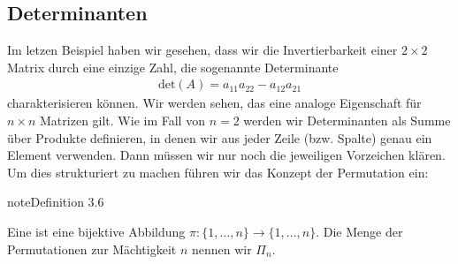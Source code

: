\documentclass[letterpaper,10pt,english]{jupyterBook}
\begin{document}
\subsection{Determinanten}
\label{\detokenize{vektorraeume/LGS:determinanten}}
Im letzen Beispiel haben wir gesehen, dass wir die Invertierbarkeit einer \(2 \times 2\) Matrix durch eine einzige Zahl, die sogenannte Determinante
\begin{equation*}
\begin{split} \text{det}(A) = a_{11} a_{22} - a_{12} a_{21}\end{split}
\end{equation*}
charakterisieren können. Wir werden sehen, das eine analoge Eigenschaft für \(n \times n\) Matrizen gilt. Wie im Fall von \(n=2\) werden wir Determinanten als Summe über Produkte definieren, in denen wir aus jeder Zeile (bzw. Spalte) genau ein Element verwenden. Dann müssen wir nur noch die jeweiligen Vorzeichen klären. Um dies strukturiert zu machen führen wir das Konzept der Permutation ein:
\label{vektorraeume/LGS:definition-10}
\begin{sphinxadmonition}{note}{Definition 3.6}



Eine  ist eine bijektive Abbildung \(\pi: \{1,\ldots,n\} \rightarrow \{1,\ldots,n\} \). Die Menge der Permutationen zur Mächtigkeit \(n\) nennen wir \(\Pi_n\).
\end{sphinxadmonition}
\end{document}
